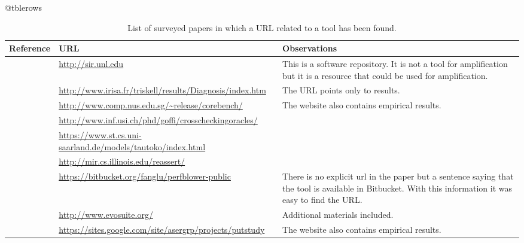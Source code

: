 \expandafter\let\csname c@tblerows\endcsname\rownum

\begin{table*}[ht]
    \caption{List of surveyed papers in which a URL related to a tool has been found.}
    \label{tab:table:tools:urls}
    \centering
    \small
    \begin{tabularx}{\textwidth}{lXX}
    \toprule
    Reference & URL & Observations \\
    \midrule

    \cite{SIR}                                & \url{http://sir.unl.edu}                                          & This is a software repository. It is not a tool for amplification but it is a resource that could be used for amplification.\\
    \cite{Baudry:2006:ITS:1134285.1134299}    & \url{http://www.irisa.fr/triskell/results/Diagnosis/index.htm}    & The URL points only to results. \\
    \cite{bohme2014corebench}                 & \url{http://www.comp.nus.edu.sg/~release/corebench/}              & The website also contains empirical results.\\
    \cite{Carzaniga:2014:COI:2568225.2568287} & \url{http://www.inf.usi.ch/phd/goffi/crosscheckingoracles/}       & \\
    \cite{Dallmeier2010}                      & \url{https://www.st.cs.uni-saarland.de/models/tautoko/index.html} & \\
    \cite{reassert2009}                       & \url{http://mir.cs.illinois.edu/reassert/}                        & \\
    \cite{fang2015perfblower}                 & \url{https://bitbucket.org/fanglu/perfblower-public}              & There is no explicit url in the paper but a sentence saying that the tool is available in Bitbucket. With this information it was easy to find the URL. \\
    \cite{fraser2011evosuite}                 & \url{http://www.evosuite.org/}                                    & Additional materials included. \\
    \cite{marri2010retrofitting}              & \url{https://sites.google.com/site/asergrp/projects/putstudy}     & The website also contains empirical results.\\

\end{tabularx}
\end{table*}
